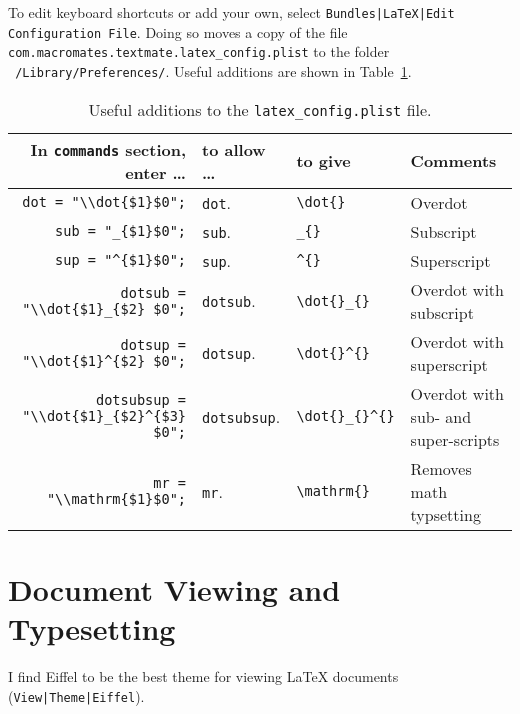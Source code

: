 \documentclass[10pt]{article}
\begin{document}
To edit keyboard shortcuts or add your own, select
\texttt{Bundles|LaTeX|Edit Configuration File}. 
Doing so moves a copy of the file 
\verb!com.macromates.textmate.latex_config.plist!
to the folder
\texttt{~/Library/Preferences/}.
Useful additions are shown in Table~\ref{tab:additions_to_plist}.

\begin{table}
\centering
\caption{Useful additions to the \texttt{latex\_config.plist} file.}
\begin{tabular}{r|l|l|l}
	In \texttt{commands} section, enter \dots & to allow \dots     & to give              & Comments \\
	\hline
	\verb!dot = "\\dot{$1}$0";!  & \texttt{dot}\cmdkey\shiftkey. & \verb!\dot{}! & Overdot \\
	\verb!sub = "_{$1}$0";!      & \texttt{sub}\cmdkey\shiftkey. & \verb!_{}!    & Subscript \\
	\verb!sup = "^{$1}$0";!      & \texttt{sup}\cmdkey\shiftkey. & \verb!^{}!    & Superscript \\
	\verb!dotsub = "\\dot{$1}_{$2} $0";! & \texttt{dotsub}\cmdkey\shiftkey. & \verb!\dot{}_{}! & Overdot with subscript \\  
	\verb!dotsup = "\\dot{$1}^{$2} $0";! & \texttt{dotsup}\cmdkey\shiftkey. & \verb!\dot{}^{}! & Overdot with superscript \\  
	\verb!dotsubsup = "\\dot{$1}_{$2}^{$3} $0";! & \texttt{dotsubsup}\cmdkey\shiftkey. & \verb!\dot{}_{}^{}! & Overdot with sub- and super-scripts  \\  
	\verb!mr = "\\mathrm{$1}$0";!  & \texttt{mr}\cmdkey\shiftkey.  & \verb!\mathrm{}! & Removes math typsetting\\
\end{tabular}
\label{tab:additions_to_plist}
\end{table}



\section{Document Viewing and Typesetting} %
\label{sec:document_viewing_and_typesetting}
I find Eiffel to be the best theme for viewing \LaTeX{} documents
(\texttt{View|Theme|Eiffel}). 
\end{document}
